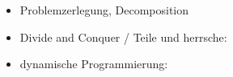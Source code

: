 {{\section*{\BrochureWebsitesAndKeywords}
{\raggedright
\begin{itemize}
  \item Problemzerlegung, Decomposition
  \item Divide and Conquer / Teile und herrsche: \href{https://de.wikipedia.org/wiki/Teile-und-herrsche-Verfahren}{}
  \item dynamische Programmierung: \href{https://de.wikipedia.org/wiki/Dynamische_Programmierung}{}
\end{itemize}


}

}{}

\def\AuthorSchrijversE{} %
\def\AuthorStijfA{} %
\def\AuthorDauksaiteJ{} %
\def\AuthorWillekesK{} %
\def\AuthorKamperM{} %
\def\AuthorRoffeyC{} %
\def\AuthorPluharZ{} %
\def\AuthorDatzkoThutS{} %
\def\AuthorPohlW{} %

\newpage}{}
